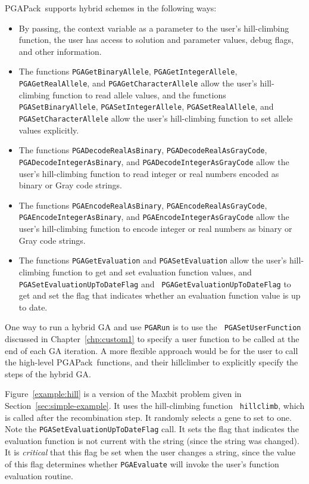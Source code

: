 \documentclass{report}
\newcommand{\pga}{PGAPack}
\begin{document}
\pga\ supports hybrid schemes in the following ways:
\begin{sloppypar}
\begin{itemize}
\item By passing, the context variable as a parameter to the user's
hill-climbing function, the user has access to solution and parameter values,
debug flags, and other information.
\item The functions {\tt PGAGetBinaryAllele}, {\tt PGAGetIntegerAllele},
{\tt PGAGetRealAllele}, and {\tt PGAGetCharacterAllele} allow the user's 
hill-climbing function to read allele values, and the functions {\tt
PGASetBinaryAllele}, {\tt PGASetIntegerAllele}, {\tt PGASetRealAllele}, and
{\tt PGASetCharacterAllele} allow the user's hill-climbing function to set
allele values explicitly.
\item The functions
{\tt PGADecodeRealAsBinary}, {\tt PGADecodeRealAsGrayCode}, {\tt
PGADecodeIntegerAsBinary}, and {\tt PGADecodeIntegerAsGrayCode} allow the
user's hill-climbing function to read integer or real numbers encoded as
binary or Gray code strings.
\item The functions
{\tt PGAEncodeRealAsBinary}, {\tt PGAEncodeRealAsGrayCode}, {\tt
PGAEncodeIntegerAsBinary}, and {\tt PGAEncodeIntegerAsGrayCode} allow the
user's hill-climbing function to encode integer or real numbers as binary or
Gray code strings.
\item The functions {\tt PGAGetEvaluation} and {\tt PGASetEvaluation} allow the
user's hill-climbing function to get and set evaluation function values, and
{\tt PGASetEvaluationUpToDateFlag} and {\tt
PGAGetEvaluationUpToDateFlag} to get and set the flag that indicates
whether an evaluation function value is up to date.
\end{itemize}
\end{sloppypar}

One way to run a hybrid GA and use {\tt PGARun} is to use the {\tt
PGASetUserFunction} discussed in Chapter~\ref{chp:custom1} to specify a user
function to be called at the end of each GA iteration.  A more flexible
approach would be for the user to call the high-level \pga\ functions, and
their hillclimber to explicitly specify the steps of the hybrid GA.

Figure~\ref{example:hill} is a version of the Maxbit problem given in
Section~\ref{sec:simple-example}.  It uses the hill-climbing function {\tt
hillclimb}, which is called after the recombination step.  It randomly selects
a gene to set to one.  Note the {\tt PGASetEvaluationUpToDateFlag} call.  It
sets the flag that indicates the evaluation function is not current with the
string (since the string was changed).  It is {\em critical} that this flag be
set when the user changes a string, since the value of this flag
determines whether {\tt PGAEvaluate} will invoke the user's function
evaluation routine.
\end{document}
